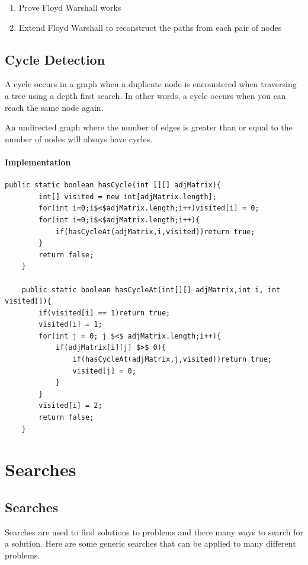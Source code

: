 \documentclass[11pt,oneside]{book}
\begin{document}
\begin{enumerate}
\item Prove Floyd Warshall works
\item Extend Floyd Warshall to reconstruct the paths from each pair of nodes
\end{enumerate}

    \chapter{ Cycle Detection }
    

A cycle occurs in a graph when a duplicate node is encountered when traversing a tree using a depth first search. In other words, a cycle occurs when you can reach the same node again.

An undirected graph where the number of edges is greater than or equal to the number of nodes will always have cycles.

\subsection{Implementation}

\begin{lstlisting}
public static boolean hasCycle(int [][] adjMatrix){
        int[] visited = new int[adjMatrix.length];
        for(int i=0;i$<$adjMatrix.length;i++)visited[i] = 0;
        for(int i=0;i$<$adjMatrix.length;i++){
            if(hasCycleAt(adjMatrix,i,visited))return true;
        }
        return false;
    }
    
    public static boolean hasCycleAt(int[][] adjMatrix,int i, int visited[]){
        if(visited[i] == 1)return true;
        visited[i] = 1;
        for(int j = 0; j $<$ adjMatrix.length;i++){
            if(adjMatrix[i][j] $>$ 0){
                if(hasCycleAt(adjMatrix,j,visited))return true;
                visited[j] = 0;
            }
        }
        visited[i] = 2;
        return false;
    }
\end{lstlisting}

\part{ Searches }
    \chapter{ Searches }
        

Searches are used to find solutions to problems and there many ways to search for a solution. Here are some generic searches that can be applied to many different problems.
\end{document}
